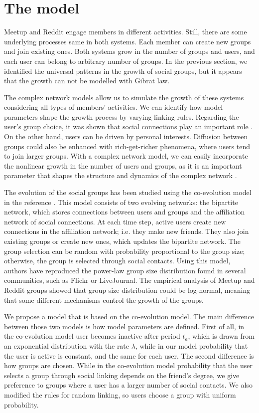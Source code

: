 \section{The model}

Meetup and Reddit engage members in different activities. Still, there are some underlying processes same in both systems. Each member can create new groups and join existing ones. Both systems grow in the number of groups and users, and each user can belong to arbitrary number of groups. In the previous section, we identified the universal patterns in the growth of social groups, but it appears that the growth can not be modelled with Gibrat law. 

The complex network models allow us to simulate the growth of these systems considering all types of members' activities. We can identify how model parameters shape the growth process by varying linking rules.
Regarding the user's group choice, it was shown that social connections play an important role \cite{kairam2012life, zheleva2009co}. On the other hand, users can be driven by personal interests. Diffusion between groups could also be enhanced with rich-get-richer phenomena, where users tend to join larger groups. With a complex network model, we can easily incorporate the nonlinear growth in the number of users and groups, as it is an important parameter that shapes the structure and dynamics of the complex network \cite{mitrovic2011quantitative, dankulov2015dynamics, vranic2021growth}.

The evolution of the social groups has been studied using the co-evolution model in the reference  \cite{zheleva2009co}. This model consists of two evolving networks: the bipartite network, which stores connections between users and groups and the affiliation network of social connections. At each time step, active users create new connections in the affiliation network; i.e. they make new friends. They also join existing groups or create new ones, which updates the bipartite network. The group selection can be random with probability proportional to the group size; otherwise, the group is selected through social contacts. Using this model, authors have reproduced the power-law group size distribution found in several communities, such as Flickr or LiveJournal. The empirical analysis of Meetup and Reddit groups showed that group size distribution could be log-normal, meaning that some different mechanisms control the growth of the groups.

We propose a model that is based on the co-evolution model. The main difference between those two models is how model parameters are defined. First of all, in the co-evolution model user becomes inactive after period $t_a$, which is drawn from an exponential distribution with the rate $\lambda$, while in our model probability that the user is active is constant, and the same for each user. The second difference is how groups are chosen. While in the co-evolution model probability that the user selects a group through social linking depends on the friend's degree, we give preference to groups where a user has a larger number of social contacts. We also modified the rules for random linking, so users choose a group with uniform probability.

